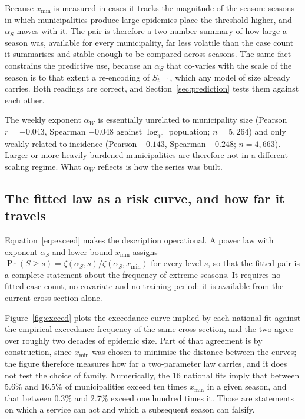 \documentclass[english,10pt,b5paper]{article}
\begin{document}
Because $x_{\min}$ is measured in cases it tracks the magnitude of the season:
seasons in which municipalities produce large epidemics place the threshold
higher, and $\alpha_S$ moves with it. The pair is therefore a two-number summary
of how large a season was, available for every municipality, far less volatile
than the case count it summarises and stable enough to be compared across
seasons. The same fact constrains the predictive use, because an $\alpha_S$ that
co-varies with the scale of the season is to that extent a re-encoding of
$S_{t-1}$, which any model of size already carries. Both readings are correct,
and Section~\ref{sec:prediction} tests them against each other.

The weekly exponent $\alpha_W$ is essentially unrelated to municipality size
(Pearson $r=-0.043$, Spearman $-0.048$ against $\log_{10}$ population; $n=5{,}264$)
and only weakly related to incidence
(Pearson $-0.143$, Spearman $-0.248$; $n=4{,}663$). Larger or more heavily burdened
municipalities are therefore not in a different scaling regime. What $\alpha_W$
reflects is how the series was built.

\subsection{The fitted law as a risk curve, and how far it travels}
\label{sec:riskmodel}

Equation~\eqref{eq:exceed} makes the description operational. A power law with
exponent $\alpha_S$ and lower bound $x_{\min}$ assigns
$\Pr(S \ge s)=\zeta(\alpha_S,s)/\zeta(\alpha_S,x_{\min})$ for every level $s$, so that
the fitted pair is a complete statement about the frequency of extreme seasons. It
requires no fitted case count, no covariate and no training period: it is
available from the current cross-section alone.

Figure~\ref{fig:exceed} plots the exceedance curve implied by each national
fit against the empirical exceedance frequency of the same cross-section, and
the two agree over roughly two decades of epidemic size. Part of that
agreement is by construction, since $x_{\min}$ was chosen to minimise the
distance between the curves; the figure therefore measures how far a
two-parameter law carries, and it does not test the choice of family.
Numerically, the 16 national fits imply that between 5.6\% and 16.5\% of
municipalities exceed ten times $x_{\min}$ in a given season, and that between
0.3\% and 2.7\% exceed one hundred times it. Those are statements on which a
service can act and which a subsequent season can falsify.
\end{document}
